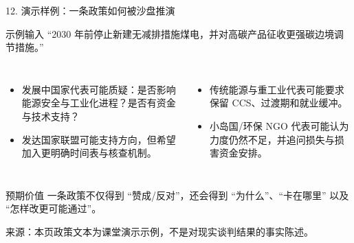 \documentclass[aspectratio=169,10.5pt]{ctexbeamer}
\newcommand{\source}[1]{\vfill{\tiny\color{textgray}来源：#1}}
\begin{document}
\begin{frame}{12. 演示样例：一条政策如何被沙盘推演}
  \begin{block}{示例输入}
    ``2030 年前停止新建无减排措施煤电，并对高碳产品征收更强碳边境调节措施。''
  \end{block}
  \begin{columns}[T]
    \begin{itemize}
      \item 发展中国家代表可能质疑：是否影响能源安全与工业化进程？是否有资金与技术支持？
      \item 发达国家联盟可能支持方向，但希望加入更明确时间表与核查机制。
    \end{itemize}
    \begin{itemize}
      \item 传统能源与重工业代表可能要求保留 CCS、过渡期和就业缓冲。
      \item 小岛国/环保 NGO 代表可能认为力度仍然不足，并追问损失与损害资金安排。
    \end{itemize}
  \end{columns}
  \begin{alertblock}{预期价值}
    一条政策不仅得到 ``赞成/反对''，还会得到 ``为什么''、``卡在哪里'' 以及 ``怎样改更可能通过''。
  \end{alertblock}
  \source{本页政策文本为课堂演示示例，不是对现实谈判结果的事实陈述。}
\end{frame}
\end{document}
